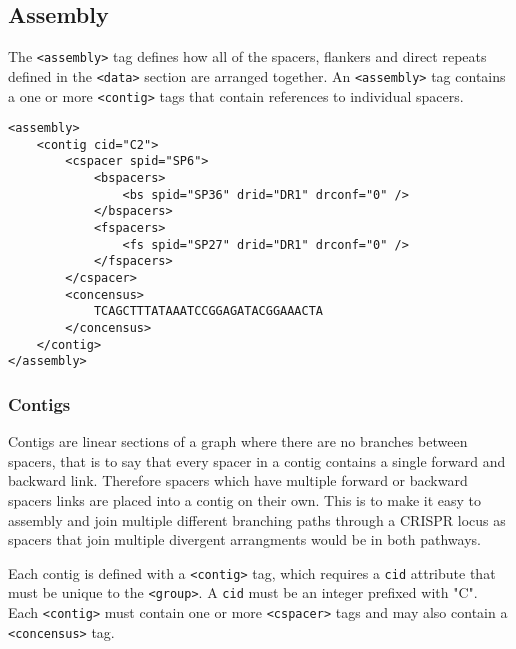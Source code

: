 \documentclass[11pt]{article} %
\begin{document}
\subsection{Assembly}
The \lstinline[language=XML_new]$<assembly>$ tag defines how all of the spacers, flankers and direct repeats defined in the \lstinline[language=XML_new]$<data>$ section are arranged together.  An \lstinline[language=XML_new]$<assembly>$ tag contains a one or more \lstinline[language=XML_new]$<contig>$ tags that contain references to individual spacers.  
\begin{lstlisting}[language=XML_new]
<assembly>
	<contig cid="C2">
		<cspacer spid="SP6">
			<bspacers>
				<bs spid="SP36" drid="DR1" drconf="0" />
			</bspacers>
			<fspacers>
				<fs spid="SP27" drid="DR1" drconf="0" />
			</fspacers>
		</cspacer>
		<concensus>
			TCAGCTTTATAAATCCGGAGATACGGAAACTA
		</concensus>
	</contig>
</assembly>
\end{lstlisting}
\subsubsection{Contigs}
Contigs are linear sections of a graph where there are no branches between spacers, that is to say that every spacer in a contig contains a single forward and backward link.  Therefore spacers which have multiple forward or backward spacers links are placed into a contig on their own.  This is to make it easy to assembly and join multiple different branching paths through a CRISPR locus as spacers that join multiple divergent arrangments would be in both pathways.

Each contig is defined with a \lstinline[language=XML_new]$<contig>$ tag, which requires a  \lstinline[language=XML_new]$cid$ attribute that must be unique to the \lstinline[language=XML_new]$<group>$.  A \lstinline[language=XML_new]$cid$ must be an integer prefixed with "C".  Each \lstinline[language=XML_new]$<contig>$ must contain one or more \lstinline[language=XML_new]$<cspacer>$ tags and may also contain a \lstinline[language=XML_new]$<concensus>$ tag.
\end{document}
